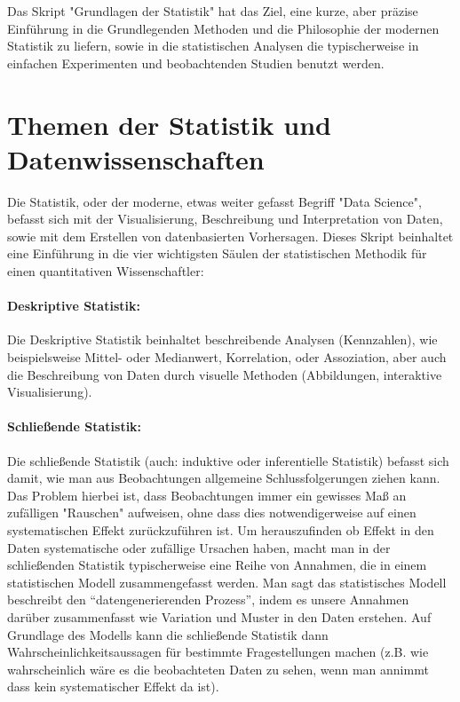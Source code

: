 \documentclass[a4paper,twoside]{tufte-book}\usepackage[]{graphicx}\usepackage[]{color}
\begin{document}
	Das Skript "Grundlagen der Statistik" hat das Ziel, eine kurze, aber präzise Einführung in die Grundlegenden Methoden und die Philosophie der modernen Statistik zu liefern, sowie in die statistischen Analysen die typischerweise in einfachen Experimenten und beobachtenden Studien benutzt werden.
	
	\section{Themen der Statistik und Datenwissenschaften}
	
	Die Statistik, oder der moderne, etwas weiter gefasst Begriff "Data Science", befasst sich mit der Visualisierung, Beschreibung und Interpretation von Daten, sowie mit dem Erstellen von datenbasierten Vorhersagen. Dieses Skript beinhaltet eine Einführung in die vier wichtigsten Säulen der statistischen Methodik für einen quantitativen Wissenschaftler:
	
	\paragraph{Deskriptive Statistik:} Die Deskriptive Statistik beinhaltet beschreibende Analysen (Kennzahlen), wie beispielsweise Mittel- oder Medianwert, Korrelation, oder Assoziation, aber auch die Beschreibung von Daten durch visuelle Methoden (Abbildungen, interaktive Visualisierung).
	
	\paragraph{Schließende Statistik:} Die schließende Statistik (auch: induktive oder inferentielle Statistik) befasst sich damit, wie man aus Beobachtungen allgemeine Schlussfolgerungen ziehen kann. Das Problem hierbei ist, dass Beobachtungen immer ein gewisses Maß an zufälligen "Rauschen" aufweisen, ohne dass dies notwendigerweise auf einen systematischen Effekt zurückzuführen ist. Um herauszufinden ob Effekt in den Daten systematische oder zufällige Ursachen haben, macht man in der schließenden Statistik typischerweise eine Reihe von Annahmen, die in einem statistischen Modell zusammengefasst werden. Man sagt das statistisches Modell beschreibt den "`datengenerierenden Prozess"', indem es unsere Annahmen darüber zusammenfasst wie Variation und Muster in den Daten erstehen. Auf Grundlage des Modells kann die schließende Statistik dann Wahrscheinlichkeitsaussagen für bestimmte Fragestellungen machen (z.B. wie wahrscheinlich wäre es die beobachteten Daten zu sehen, wenn man annimmt dass kein systematischer Effekt da ist). 
	
\end{document}
